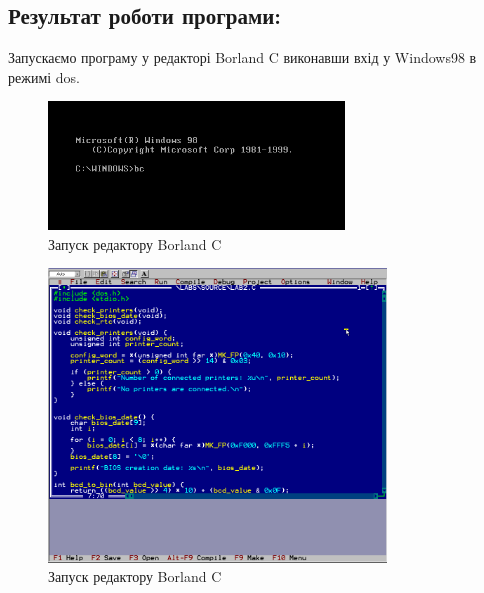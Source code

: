 \clearpage
\subsection{Результат роботи програми:}
Запускаємо програму у редакторі Borland C виконавши вхід у Windows98 в режимі dos.

\begin{figure}[h]
    \centering
    \includegraphics[width=0.7\textwidth]{reports/AC/lab2/assets/1.png}
    \caption{Запуск редактору Borland C}
\end{figure}

\begin{figure}[h]
    \centering
    \includegraphics[width=0.8\textwidth]{reports/AC/lab2/assets/3.png}
    \caption{Запуск редактору Borland C}
\end{figure}

